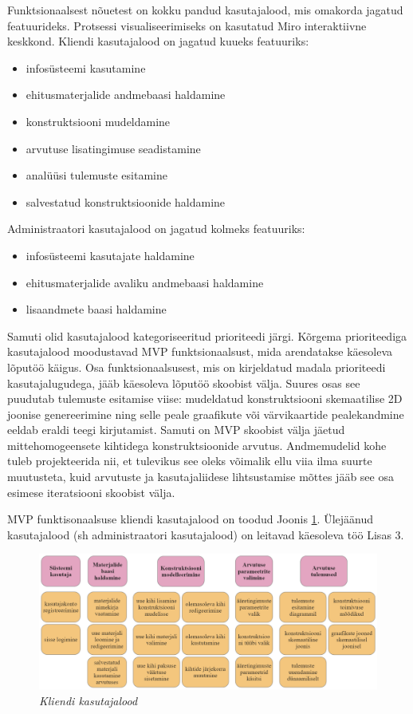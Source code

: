 Funktsionaalsest nõuetest on kokku pandud kasutajalood, mis omakorda jagatud featuurideks. Protsessi visualiseerimiseks on kasutatud Miro interaktiivne
keskkond. Kliendi kasutajalood on jagatud kuueks featuuriks:
\begin{itemize}
    \item infosüsteemi kasutamine
    \item ehitusmaterjalide andmebaasi haldamine
    \item konstruktsiooni mudeldamine
    \item arvutuse lisatingimuse seadistamine
    \item analüüsi tulemuste esitamine
    \item salvestatud konstruktsioonide haldamine
\end{itemize}

Administraatori kasutajalood on jagatud kolmeks featuuriks:
\begin{itemize}
    \item infosüsteemi kasutajate haldamine
    \item ehitusmaterjalide avaliku andmebaasi haldamine
    \item lisaandmete baasi haldamine
\end{itemize}

Samuti olid kasutajalood kategoriseeritud prioriteedi järgi. Kõrgema prioriteediga kasutajalood moodustavad MVP funktsionaalsust, mida arendatakse käesoleva lõputöö käigus.
Osa funktsionaalsusest, mis on kirjeldatud madala prioriteedi kasutajalugudega, jääb käesoleva lõputöö skoobist välja. Suures osas see puudutab tulemuste esitamise
viise: mudeldatud konstruktsiooni skemaatilise 2D joonise genereerimine ning selle peale graafikute või värvikaartide pealekandmine eeldab 
eraldi teegi kirjutamist. Samuti on MVP skoobist välja jäetud mittehomogeensete kihtidega konstruktsioonide arvutus. Andmemudelid kohe tuleb projekteerida nii, et tulevikus
see oleks võimalik ellu viia ilma suurte muutusteta, kuid arvutuste ja kasutajaliidese lihtsustamise mõttes jääb see osa esimese iteratsiooni skoobist välja. 

MVP funktisonaalsuse kliendi kasutajalood on toodud Joonis \ref{fig:client_userstories}. Ülejäänud kasutajalood (sh administraatori kasutajalood) on leitavad käesoleva töö Lisas 3. 
\begin{figure}[ht]
    \centering
    \includegraphics[width=1\textwidth]{figures/analysis/client_userstories0.png}
    \caption[Funktsionaalsed nõuded, kliendi kasutajalood]{\textit{Kliendi kasutajalood}}
    \label{fig:client_userstories}
\end{figure}


